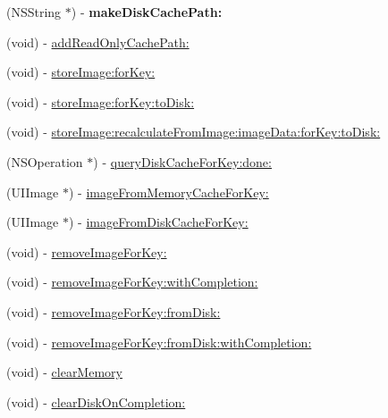 \begin{DoxyCompactItemize}
\mbox{\label{interface_s_d_image_cache_a48625e7237af6b6b4cc6c52ee8a661b0}} 
(N\+S\+String $\ast$) -\/ {\bfseries make\+Disk\+Cache\+Path\+:}
\item 
(void) -\/ \mbox{\hyperlink{interface_s_d_image_cache_a9bfedcc9878284b76502287b4b16c1a6}{add\+Read\+Only\+Cache\+Path\+:}}
\item 
(void) -\/ \mbox{\hyperlink{interface_s_d_image_cache_a28d995cab90e214dc5603403a7ed7753}{store\+Image\+:for\+Key\+:}}
\item 
(void) -\/ \mbox{\hyperlink{interface_s_d_image_cache_a558ee696fd5cb48edb05da606701fcec}{store\+Image\+:for\+Key\+:to\+Disk\+:}}
\item 
(void) -\/ \mbox{\hyperlink{interface_s_d_image_cache_a1724c0d0a91b64a097ec63a9934073bd}{store\+Image\+:recalculate\+From\+Image\+:image\+Data\+:for\+Key\+:to\+Disk\+:}}
\item 
(N\+S\+Operation $\ast$) -\/ \mbox{\hyperlink{interface_s_d_image_cache_a55f77fe338c314178df36dc68a4995fd}{query\+Disk\+Cache\+For\+Key\+:done\+:}}
\item 
(U\+I\+Image $\ast$) -\/ \mbox{\hyperlink{interface_s_d_image_cache_abe13b43b333bbb5bbe56142b8d573bd2}{image\+From\+Memory\+Cache\+For\+Key\+:}}
\item 
(U\+I\+Image $\ast$) -\/ \mbox{\hyperlink{interface_s_d_image_cache_ad3502d702952c60cd046ba4e7cba0197}{image\+From\+Disk\+Cache\+For\+Key\+:}}
\item 
(void) -\/ \mbox{\hyperlink{interface_s_d_image_cache_a1d6ca2afef59216e0cb1740d431833cf}{remove\+Image\+For\+Key\+:}}
\item 
(void) -\/ \mbox{\hyperlink{interface_s_d_image_cache_add965b440292c9da74fc85b395a9812a}{remove\+Image\+For\+Key\+:with\+Completion\+:}}
\item 
(void) -\/ \mbox{\hyperlink{interface_s_d_image_cache_a61cf4a9222043f0b302b8fdb0b522e3f}{remove\+Image\+For\+Key\+:from\+Disk\+:}}
\item 
(void) -\/ \mbox{\hyperlink{interface_s_d_image_cache_abf0e1a46fc6db455e464efda62fcc55d}{remove\+Image\+For\+Key\+:from\+Disk\+:with\+Completion\+:}}
\item 
(void) -\/ \mbox{\hyperlink{interface_s_d_image_cache_a931b161c379dd952affffe8c0544527d}{clear\+Memory}}
\item 
(void) -\/ \mbox{\hyperlink{interface_s_d_image_cache_ab936a83a1b711209d30f9051cc3658cc}{clear\+Disk\+On\+Completion\+:}}
\item 

\end{DoxyCompactItemize}
